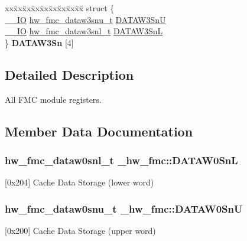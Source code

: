 \begin{DoxyCompactItemize}
\begin{tabbing}
\end{tabbing}\item 
\begin{tabbing}
xx\=xx\=xx\=xx\=xx\=xx\=xx\=xx\=xx\=\kill
struct \{\\
\>\hyperlink{core__sc300_8h_aec43007d9998a0a0e01faede4133d6be}{\_\_IO} \hyperlink{union__hw__fmc__dataw3snu}{hw\_fmc\_dataw3snu\_t} \hyperlink{struct__hw__fmc_ae6085d470d4279bb18ee1e4445160867}{DATAW3SnU}\\
\>\hyperlink{core__sc300_8h_aec43007d9998a0a0e01faede4133d6be}{\_\_IO} \hyperlink{union__hw__fmc__dataw3snl}{hw\_fmc\_dataw3snl\_t} \hyperlink{struct__hw__fmc_aab36f7ff94f108996bee1605190fadb3}{DATAW3SnL}\\
\} {\bfseries DATAW3Sn} \mbox{[}4\mbox{]}\hypertarget{struct__hw__fmc_aaf5a23a06b16e2a155394523819de029}{}\label{struct__hw__fmc_aaf5a23a06b16e2a155394523819de029}
\\

\end{tabbing}\end{DoxyCompactItemize}


\subsection{Detailed Description}
All F\+MC module registers. 

\subsection{Member Data Documentation}
\subsubsection[{\texorpdfstring{D\+A\+T\+A\+W0\+SnL}{DATAW0SnL}}]{ {\bf hw\+\_\+fmc\+\_\+dataw0snl\+\_\+t} \+\_\+hw\+\_\+fmc\+::\+D\+A\+T\+A\+W0\+SnL}\hypertarget{struct__hw__fmc_a8931c4e326e62502a8042a175b638290}{}\label{struct__hw__fmc_a8931c4e326e62502a8042a175b638290}
\mbox{[}0x204\mbox{]} Cache Data Storage (lower word) 
\subsubsection[{\texorpdfstring{D\+A\+T\+A\+W0\+SnU}{DATAW0SnU}}]{ {\bf hw\+\_\+fmc\+\_\+dataw0snu\+\_\+t} \+\_\+hw\+\_\+fmc\+::\+D\+A\+T\+A\+W0\+SnU}\hypertarget{struct__hw__fmc_a5209259882068fa2c53f80e3335af19b}{}\label{struct__hw__fmc_a5209259882068fa2c53f80e3335af19b}
\mbox{[}0x200\mbox{]} Cache Data Storage (upper word) 
